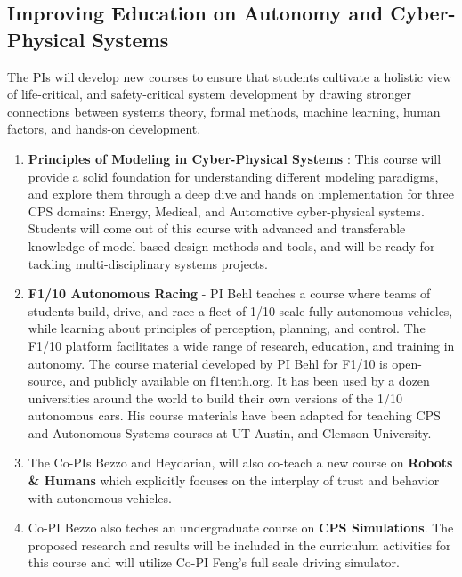 \subsection{Improving Education on Autonomy and Cyber-Physical Systems}
The PIs will develop new courses to ensure that students cultivate a holistic view of life-critical, and safety-critical system development by drawing stronger connections between systems theory, formal methods, machine learning, human factors, and hands-on development.
\begin{enumerate}[itemsep=0pt,parsep=0pt,topsep=4pt,leftmargin=0.4in]
    \item \textbf{Principles of Modeling in Cyber-Physical Systems} : This course will provide a solid foundation for understanding different modeling paradigms, and explore them through a deep dive and hands on implementation for three CPS domains: Energy, Medical, and Automotive cyber-physical systems. Students will come out of this course with advanced and transferable knowledge of model-based design methods and tools, and will be ready for tackling multi-disciplinary systems projects. 
    \item \textbf{F1/10 Autonomous Racing} - PI Behl teaches a course where teams of students build, drive, and race a fleet of 1/10 scale fully autonomous vehicles, while learning about principles of perception, planning, and control. The F1/10 platform facilitates a wide range of research, education, and training in autonomy. The course material developed by PI Behl for F1/10 is open-source, and publicly available on f1tenth.org. It has been used by a dozen universities around the world to build their own versions of the 1/10 autonomous cars. His course materials have been adapted for teaching CPS and Autonomous Systems courses at UT Austin, and Clemson University.
    \item The Co-PIs Bezzo and Heydarian, will also co-teach a new course on \textbf{Robots \& Humans} which explicitly focuses on the interplay of trust and behavior with autonomous vehicles.
    \item Co-PI Bezzo also teches an undergraduate course on \textbf{CPS Simulations}. The proposed research and results will be included in the curriculum activities for this course and will utilize Co-PI Feng's full scale driving simulator.
\end{enumerate}
